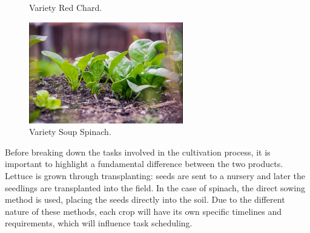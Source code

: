\begin{figure}[ht!]
\begin{minipage}[b]{0.45\textwidth}
        \caption{Variety Red Chard.}
        \label{fig:red}
    \end{minipage}
    \begin{minipage}[b]{0.45\textwidth}
        \centering
        \includegraphics[width=0.6\textwidth]{img/soup_spinach.png}
        \caption{Variety Soup Spinach.}
        \label{fig:soup}
    \end{minipage}
\end{figure}

\newpage
Before breaking down the tasks involved in the cultivation process, it is important to highlight a fundamental difference between the two products.
Lettuce is grown through transplanting: seeds are sent to a nursery and later the seedlings are transplanted into the field.
In the case of spinach, the direct sowing method is used, placing the seeds directly into the soil.
Due to the different nature of these methods, each crop will have its own specific timelines and requirements, which will influence task scheduling.

